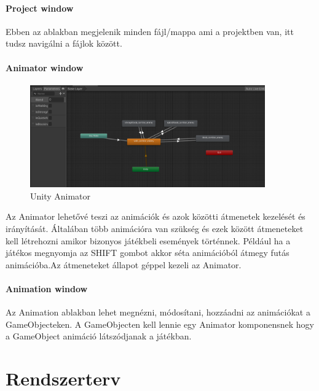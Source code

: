 \documentclass[
]{thesis-ekf}
\theoremstyle{definition}
\theoremstyle{remark}
\begin{document}
\subsubsection{Project window}
Ebben az ablakban megjelenik minden fájl/mappa ami a projektben van, itt tudsz navigálni a fájlok között.\cite{UnityProject}
\subsubsection{Animator window}

\begin{figure}[h!]
	\centering
	\includegraphics[width=0.9\textwidth]{UnityAnimatorKep.png}
	\caption{Unity Animator}
	\label{fig:unityAnimator}
\end{figure}
Az Animator lehetővé teszi az animációk és azok közötti átmenetek kezelését és irányítását. Általában több animációra van szükség és ezek között átmeneteket kell létrehozni amikor bizonyos játékbeli események történnek. Például ha a játékos megnyomja az SHIFT gombot akkor séta animációból átmegy futás animációba.Az átmeneteket állapot géppel kezeli az Animator.\cite{UnityAnimatorController}

\subsubsection{Animation window}
Az Animation ablakban lehet megnézni, módosítani, hozzáadni az animációkat a GameObjecteken. A GameObjecten kell lennie egy Animator komponensnek hogy a GameObject animáció látszódjanak a játékban.\cite{UnityAnimation}

\chapter{Rendszerterv}
\end{document}
